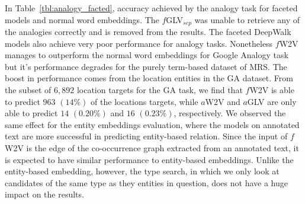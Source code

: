 In Table~\ref{tbl:analogy_facted}, accuracy achieved by the analogy task for faceted models and normal word embeddings. The $f$GLV$_{sep}$ was unable to retrieve any of the analogies correctly and is removed from the results. The faceted DeepWalk models also achieve very poor performance for analogy tasks. Nonetheless $f$W2V manages to outperform the normal word embeddings for Google Analogy task but it's performance degrades for the purely term-based dataset of MRS. The boost in performance comes from the location entities in the GA dataset. From the subset of $6,892$ location targets for the GA task, we find that $f$W2V is able to predict $963$ $(14\%)$ of the locations targets, while $a$W2V and $a$GLV are only able to predict $14$ $(0.20\%)$ and $16$ $(0.23\%)$, respectively. We observed the same effect for the entity embeddings evaluation, where the models on annotated text are more successful in predicting entity-based relation. Since the input of $f$W2V is the edge of the co-occurrence graph extracted from an annotated text, it is expected to have similar performance to entity-based embeddings. Unlike the entity-based embedding, however, the type search, in which we only look at candidates of the same type as they entities in question, does not have a huge impact on the results. 

\begin{table}[t]
\caption{Word analogy results for faceted model . Shown is the prediction accuracy for the normal analogy tasks and the variation where predictions are limited to the correct entity type. The best two values per task and variation are highlighted.}
\label{tbl:analogy_facted}
\setlength{\tabcolsep}{8pt} %
\renewcommand{\arraystretch}{1.0} %
\end{table}

